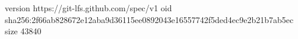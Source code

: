 version https://git-lfs.github.com/spec/v1
oid sha256:2f66ab828672e12aba9d36115ee0892043e16557742f5ded4ec9e2b21b7ab5ec
size 43840
